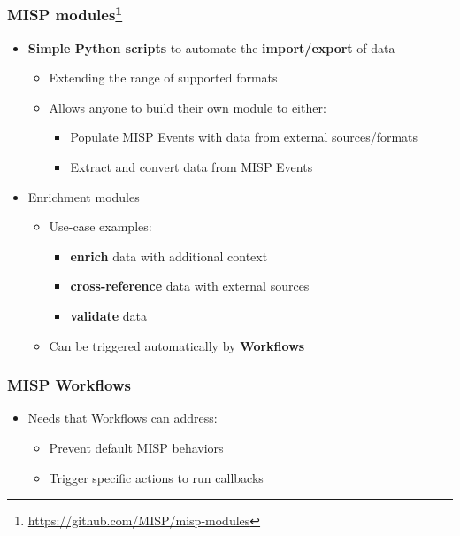 \begin{frame}
    \frametitle{MISP modules\footnote{\url{https://github.com/MISP/misp-modules}}}
    \begin{itemize}
        \item \textbf{Simple Python scripts} to automate the \textbf{import/export} of data
        \begin{itemize}
            \item Extending the range of supported formats
            \item Allows anyone to build their own module to either:
            \begin{itemize}
                \item Populate MISP Events with data from external sources/formats
                \item Extract and convert data from MISP Events
            \end{itemize}
        \end{itemize}
        \item Enrichment modules
        \begin{itemize}
            \item Use-case examples:
            \begin{itemize}
                \item \textbf{enrich} data with additional context
                \item \textbf{cross-reference} data with external sources
                \item \textbf{validate} data
            \end{itemize}
            \item Can be triggered automatically by \textbf{Workflows}
        \end{itemize}
    \end{itemize}
\end{frame}

\begin{frame}
    \frametitle{MISP Workflows}
    \begin{itemize}
        \item Needs that Workflows can address:
        \begin{itemize}
            \item Prevent default MISP behaviors
            \item Trigger specific actions to run callbacks
        \end{itemize}
    \end{itemize}
    \begin{center}
    \end{center}
\end{frame}

